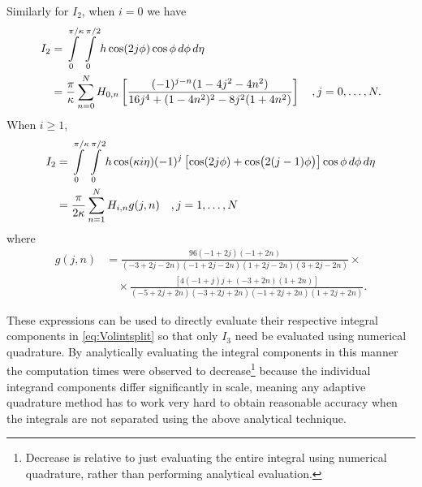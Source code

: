 Similarly for $I_2$, when $i=0$ we have
\begin{align}
I_2 &= \int\limits_0^{\pi/\kappa} \int\limits_0^{\pi/2} h \cos(2j\phi)\cos\phi\,d\phi\,d\eta \notag \\
&=\frac{\pi}{\kappa}\sum_{n=0}^N H_{0,n} \left[ \frac{(-1)^{j-n}(1-4j^2-4n^2)}{16j^4+(1-4n^2)^2-8j^2(1+4n^2)}\right] \quad,j=0,\ldots,N.
\end{align}
When $i\ge1$,
\begin{align}
I_2&=\int\limits_0^{\pi/\kappa} \int\limits_0^{\pi/2} h \cos(\kappa i \eta)(-1)^j\left[\cos(2j\phi)+\cos \bigl(2(j-1)\phi \bigr) \right]\cos\phi\,d\phi\,d\eta \notag \\
&=\frac{\pi}{2\kappa}\sum_{n=1}^N H_{i,n} g(j,n) \quad,j=1,\ldots,N
\end{align}
where
\begin{align*}
g(j,n)&=\frac{96(-1+2j)(-1+2n)}{(-3+2j-2n)(-1+2j-2n)(1+2j-2n)(3+2j-2n)} \times \\
& \quad\times\frac{\left[ 4(-1+j)j+(-3+2n)(1+2n)\right]}{(-5+2j+2n)(-3+2j+2n)(-1+2j+2n)(1+2j+2n)}.
\end{align*}

These expressions can be used to directly evaluate their respective integral components in \eqref{eq:Volintsplit} so that only $I_3$ need be evaluated using numerical quadrature. By analytically evaluating the integral components in this manner the computation times were observed to decrease\footnote{Decrease is relative to just evaluating the entire integral using numerical quadrature, rather than performing analytical evaluation.} because the individual integrand components differ significantly in scale, meaning any adaptive quadrature method has to work very hard to obtain reasonable accuracy when the integrals are not separated using the above analytical technique.
